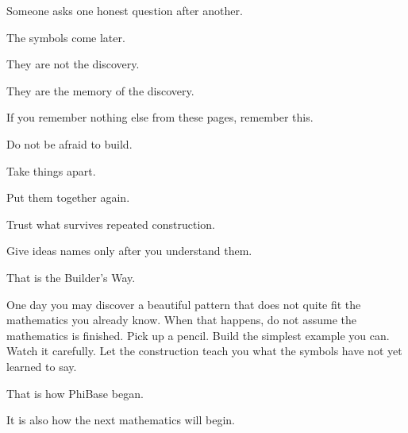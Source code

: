 Someone asks one honest question after another.

The symbols come later.

They are not the discovery.

They are the memory of the discovery.

If you remember nothing else from these pages, remember this.

Do not be afraid to build.

Take things apart.

Put them together again.

Trust what survives repeated construction.

Give ideas names only after you understand them.

That is the Builder's Way.

One day you may discover a beautiful pattern that does not quite fit the mathematics you already know. When that happens, do not assume the mathematics is finished. Pick up a pencil. Build the simplest example you can. Watch it carefully. Let the construction teach you what the symbols have not yet learned to say.

That is how PhiBase began.

It is also how the next mathematics will begin.